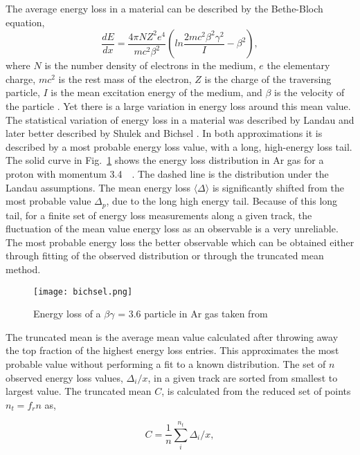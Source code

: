 The average energy loss in a material can be described by the Bethe-Bloch equation,
\begin{equation}\label{eq:bb}
\frac{dE}{dx} = \frac{4\pi NZ^2e^4}{mc^2\beta^2} (ln \frac{2mc^2\beta^2\gamma^2}{I} - \beta^2),
\end{equation}
where $N$ is the number density of electrons in the medium, $e$ the elementary charge, $mc^2$ is the rest mass of the electron, $Z$ is the charge of the traversing particle, $I$ is the mean excitation energy of the medium, and $\beta$ is the velocity of the particle \cite{blumrol}. Yet there is a large variation in energy loss around this mean value. The statistical variation of energy loss in a material was described by Landau \cite{landau} and later better described by Shulek \cite{shulek} and Bichsel \cite{bichsel1}. In both approximations it is described by a most probable energy loss value, with a long, high-energy loss tail. The solid curve in Fig.~\ref{fig:straggling} shows the energy loss distribution in Ar gas for a proton with momentum \SI{3.4}{\giga\eVperc}. The dashed line is the distribution under the Landau assumptions. The mean energy loss $\langle\Delta\rangle$ is significantly shifted from the most probable value $\Delta_p$, due to the long high energy tail.  Because of this long tail, for a finite set of energy loss measurements along a given track, the fluctuation of the mean value energy loss as an observable is a very unreliable. The most probable energy loss the better observable which can be obtained either through fitting of the observed distribution or through the truncated mean method. 

\begin{figure}
\texttt{[image: bichsel.png]}
\caption{Energy loss of a $\beta\gamma$ = 3.6 particle in Ar gas taken from \cite{bichsel}}
\label{fig:straggling}
\end{figure}

The truncated mean is the average mean value calculated after throwing away the top fraction of the highest energy loss entries. This approximates the most probable value without performing a fit to a known distribution. The set of $n$ observed energy loss values, $\Delta_i/x$, in a given track are sorted from smallest to largest value. The truncated mean $C$, is calculated from the reduced set of points $n_t = f_r n$ as,

\begin{equation}
C = \frac{1}{n} \sum\limits_{i}^{n_t} \Delta_i/x,
\label{eq:truncmean}
\end{equation}

